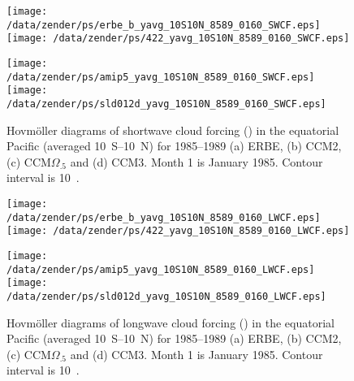 \documentclass[twocolumn,final,11pt]{article}
\begin{document}
\begin{figure*}
\begin{center}
\texttt{[image: /data/zender/ps/erbe\_b\_yavg\_10S10N\_8589\_0160\_SWCF.eps]}%
\texttt{[image: /data/zender/ps/422\_yavg\_10S10N\_8589\_0160\_SWCF.eps]}%

\texttt{[image: /data/zender/ps/amip5\_yavg\_10S10N\_8589\_0160\_SWCF.eps]}%
\texttt{[image: /data/zender/ps/sld012d\_yavg\_10S10N\_8589\_0160\_SWCF.eps]}%
\end{center}
\caption[Hovm\"oller diagrams of shortwave cloud forcing 
in the equatorial Pacific for 1985--1989 ERBE, CCM2,
CCM$\Omega_{.5}$, and CCM3]{ 
Hovm\"oller diagrams of shortwave cloud forcing (\wxmS) in the
equatorial Pacific (averaged 10~\degreee S--10~\degreee N) for
1985--1989 (a) ERBE, (b) CCM2, (c) CCM$\Omega_{.5}$ and (d) 
CCM3.
Month 1 is January 1985.  
Contour interval is 10~\wxmS. 
\label{fig:yavg_10S10N_8589_0160_SWCF}}
\end{figure*}
\clearpage

\begin{figure*}
\begin{center}
\texttt{[image: /data/zender/ps/erbe\_b\_yavg\_10S10N\_8589\_0160\_LWCF.eps]}%
\texttt{[image: /data/zender/ps/422\_yavg\_10S10N\_8589\_0160\_LWCF.eps]}%

\texttt{[image: /data/zender/ps/amip5\_yavg\_10S10N\_8589\_0160\_LWCF.eps]}%
\texttt{[image: /data/zender/ps/sld012d\_yavg\_10S10N\_8589\_0160\_LWCF.eps]}%
\end{center}
\caption[Hovm\"oller diagrams of longwave cloud forcing 
in the equatorial Pacific for 1985--1989 ERBE, CCM2,
CCM$\Omega_{.5}$, and CCM3]{ 
Hovm\"oller diagrams of longwave cloud forcing (\wxmS) in the
equatorial Pacific (averaged 10~\degreee S--10~\degreee N) for
1985--1989 (a) ERBE, (b) CCM2, (c) CCM$\Omega_{.5}$ and (d) 
CCM3.
Month 1 is January 1985.  
Contour interval is 10~\wxmS. 
\label{fig:yavg_10S10N_8589_0160_LWCF}}
\end{figure*}
\clearpage
\end{document}
